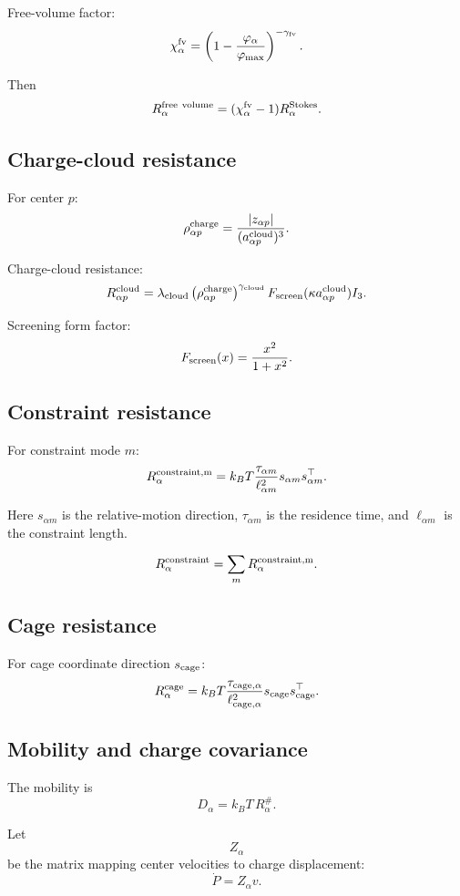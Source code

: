 Free-volume factor:
\[
\chi_\alpha^{\rm fv}
=
\left(1-\frac{\varphi_\alpha}{\varphi_{\max}}\right)^{-\gamma_{\rm fv}}.
\]

Then
\[
R_\alpha^{\rm free\ volume}
=
(\chi_\alpha^{\rm fv}-1)R_\alpha^{\rm Stokes}.
\]

\subsection{Charge-cloud resistance}

For center \(p\):
\[
\rho_{\alpha p}^{\rm charge}
=
\frac{|z_{\alpha p}|}{(a_{\alpha p}^{\rm cloud})^3}.
\]

Charge-cloud resistance:
\[
R_{\alpha p}^{\rm cloud}
=
\lambda_{\rm cloud}
\left(\rho_{\alpha p}^{\rm charge}\right)^{\gamma_{\rm cloud}}
F_{\rm screen}(\kappa a_{\alpha p}^{\rm cloud})
I_3.
\]

Screening form factor:
\[
F_{\rm screen}(x)=\frac{x^2}{1+x^2}.
\]

\subsection{Constraint resistance}

For constraint mode \(m\):
\[
R_{\alpha}^{\rm constraint,m}
=
k_BT
\frac{\tau_{\alpha m}}{\ell_{\alpha m}^2}
s_{\alpha m}s_{\alpha m}^\top.
\]

Here \(s_{\alpha m}\) is the relative-motion direction, \(\tau_{\alpha m}\)
is the residence time, and \(\ell_{\alpha m}\) is the constraint length.

\[
R_{\alpha}^{\rm constraint}=\sum_mR_{\alpha}^{\rm constraint,m}.
\]

\subsection{Cage resistance}

For cage coordinate direction \(s_{\rm cage}\):
\[
R_{\alpha}^{\rm cage}
=
k_BT
\frac{\tau_{\rm cage,\alpha}}{\ell_{\rm cage,\alpha}^2}
s_{\rm cage}s_{\rm cage}^\top.
\]

\subsection{Mobility and charge covariance}

The mobility is
\[
D_\alpha=k_BT\,R_\alpha^\#.
\]

Let
\[
Z_\alpha
\]
be the matrix mapping center velocities to charge displacement:
\[
\dot P=Z_\alpha v.
\]

